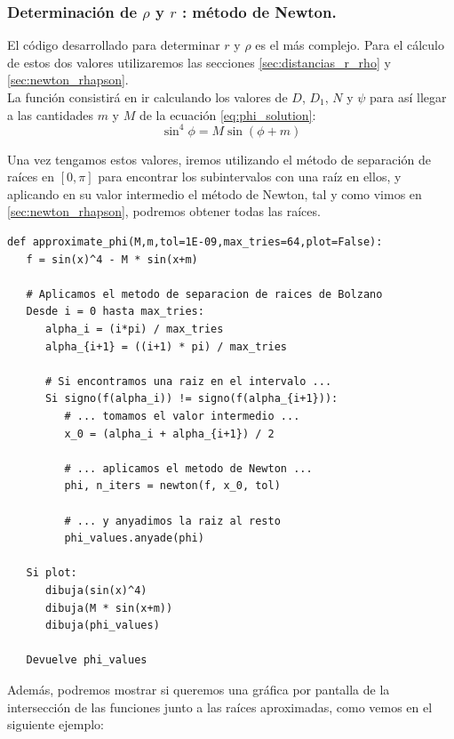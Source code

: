 \documentclass[11pt]{book}
\begin{document}
\subsubsection{Determinación de $\rho$ y $r$ : método de Newton.}
El código desarrollado para determinar $r$ y $\rho$ es el más complejo. Para el cálculo de estos dos valores utilizaremos las secciones \ref{sec:distancias_r_rho} y \ref{sec:newton_rhapson}.\\

La función consistirá en ir calculando los valores de $D$, $D_1$, $N$ y $\psi$ para así llegar a las cantidades $m$ y $M$ de la ecuación \eqref{eq:phi_solution}:
\[
\sin^4{\phi}=M\sin{(\phi+m)}
\]

Una vez tengamos estos valores, iremos utilizando el método de separación de raíces en $[0,\pi]$ para encontrar los subintervalos con una raíz en ellos, y aplicando en su valor intermedio el método de Newton, tal y como vimos en \ref{sec:newton_rhapson}, podremos obtener todas las raíces.
\begin{lstlisting}[style=PythonCode]
def approximate_phi(M,m,tol=1E-09,max_tries=64,plot=False):	
   f = sin(x)^4 - M * sin(x+m)
   
   # Aplicamos el metodo de separacion de raices de Bolzano
   Desde i = 0 hasta max_tries:
      alpha_i = (i*pi) / max_tries
      alpha_{i+1} = ((i+1) * pi) / max_tries
      
      # Si encontramos una raiz en el intervalo ...
      Si signo(f(alpha_i)) != signo(f(alpha_{i+1})):
         # ... tomamos el valor intermedio ...
         x_0 = (alpha_i + alpha_{i+1}) / 2
         
         # ... aplicamos el metodo de Newton ...
         phi, n_iters = newton(f, x_0, tol)
         
         # ... y anyadimos la raiz al resto
         phi_values.anyade(phi)
   
   Si plot:
      dibuja(sin(x)^4)
      dibuja(M * sin(x+m))
      dibuja(phi_values)
   
   Devuelve phi_values
\end{lstlisting}

Además, podremos mostrar si queremos una gráfica por pantalla de la intersección de las funciones junto a las raíces aproximadas, como vemos en el siguiente ejemplo:
\end{document}
